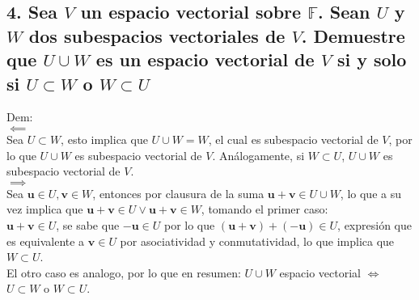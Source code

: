 \documentclass[11pt]{article}
\renewcommand{\vec}[1]{\mathbf{#1}}
\begin{document}
\subsection*{4. Sea $V$ un espacio vectorial sobre $\mathbb{F}$. Sean $U$ y $W$ dos subespacios vectoriales de $V$. Demuestre que $U\cup W$ es un espacio vectorial de $V$ si y solo si $U\subset W$ o $W\subset U$}
Dem:\\
$\impliedby$\\
Sea $U\subset W$, esto implica que $U\cup W=W$, el cual es subespacio vectorial de $V$, por lo que $U\cup W$ es subespacio vectorial de $V$. Análogamente, si $W\subset U$, $U\cup W$ es subespacio vectorial de $V$.\\
$\implies$\\
Sea $\vec{u}\in U,\vec{v}\in W$, entonces por clausura de la suma $\vec{u}+\vec{v}\in U\cup W$, lo que a su vez implica que $\vec{u}+\vec{v}\in U \vee \vec{u}+\vec{v}\in W$, tomando el primer caso:\\
$\vec{u}+\vec{v}\in U$, se sabe que $-\vec{u}\in U$ por lo que $(\vec{u}+\vec{v})+(-\vec{u})\in U$, expresión que es equivalente a $\vec{v}\in U$ por asociatividad y conmutatividad, lo que implica que $W\subset U$.\\
El otro caso es analogo, por lo que en resumen: $U\cup W$ espacio vectorial $\iff$ $U\subset W$ o $W\subset U$.
\end{document}
